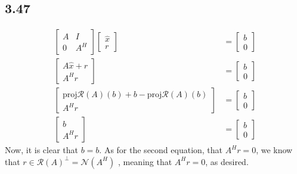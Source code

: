 \documentclass[letterpaper,12pt]{article}
\theoremstyle{definition}
\begin{document}
\subsection*{3.47}
\begin{align*}
    \begin{bmatrix}
        A & I \\
        0 & A^H
    \end{bmatrix}
    \begin{bmatrix}
        \hat x\\
        r
    \end{bmatrix}
    &=
    \begin{bmatrix}
        b \\ 0
    \end{bmatrix}\\
    \begin{bmatrix}
        A \hat x + r \\
        A^Hr
    \end{bmatrix}
    &=
    \begin{bmatrix}
        b\\0
    \end{bmatrix}\\
    \begin{bmatrix}
        \text{proj}{\mathscr{R}(A)}(b) + b - \text{proj}{\mathscr{R}(A)}(b) \\
        A^Hr
    \end{bmatrix}
    &=
    \begin{bmatrix}
        b\\0
    \end{bmatrix}\\
    \begin{bmatrix}
        b\\
        A^Hr
    \end{bmatrix}
    &=
    \begin{bmatrix}
        b\\0
    \end{bmatrix}
\end{align*}
Now, it is clear that $b=b$. As for the second equation, that $A^Hr = 0$, we know that $r \in \mathscr{R}(A)^\bot = \mathscr{N}(A^H)$
, meaning that $A^Hr = 0$, as desired.
\end{document}
